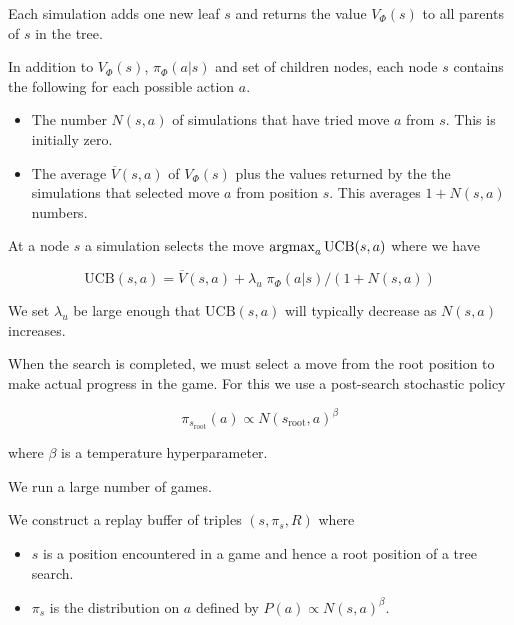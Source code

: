 {\vfill
Each simulation adds one new leaf $s$ and returns the value $V_\Phi(s)$ to all parents of $s$ in the tree.


In addition to $V_\Phi(s)$, $\pi_\Phi(a|s)$ and set of children nodes, each node $s$ contains
the following for each possible action $a$.

\vfill
\begin{itemize}
\item The number $N(s,a)$ of simulations that have tried move $a$ from $s$. This is initially zero.

\vfill
\item The average $\overline{V}(s,a)$ of $V_\Phi(s)$ plus the values returned by the the simulations that selected
 move $a$ from position $s$.  This averages $1 + N(s,a)$ numbers.
\end{itemize}


At a node $s$ a simulation selects the move $\operatorname*{argmax}_a \mathrm{UCB}(s,a)$ where we have

\vfill
$$\mathrm{UCB}(s,a) =   \overline{V}(s,a) + \lambda_u\; \pi_\Phi(a|s)/(1+N(s,a))$$

\vfill
We set $\lambda_u$ be large enough that $\mathrm{UCB}(s,a)$ will typically decrease as $N(s,a)$ increases.


When the search is completed, we must select a move from the root position to make actual progress in the game.  For this we use a post-search stochastic policy

\vfill
$$\pi_{s_{\mathrm{root}}}(a) \propto N(s_{\mathrm{root}},a)^\beta$$

\vfill
where $\beta$ is a temperature hyperparameter.


We run a large number of games.

\vfill
We construct a replay buffer of triples $(s,\pi_{s},R)$ where

\vfill
\begin{itemize}
\item $s$ is a position encountered in a game and hence a root position of a tree search.

\vfill
\item $\pi_{s}$ is the distribution on $a$ defined by $P(a) \propto N(s,a)^\beta$.


\end{itemize}}
